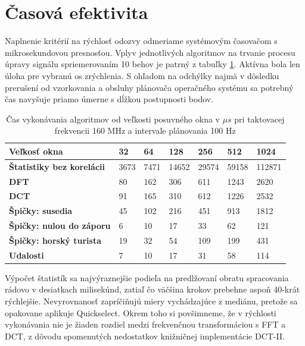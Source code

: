 \section{Časová efektivita}
Naplnenie kritérií na rýchlosť odozvy odmeriame systémovým časovačom s mikrosekundovou presnosťou.
Vplyv jednotlivých algoritmov na trvanie procesu úpravy signálu spriemerovaním 10 behov
je patrný z tabuľky \ref{tab:algorithm-execution}. Aktívna bola len úloha pre vybranú os zrýchlenia. S ohľadom na odchýlky
najmä v dôsledku prerušení od vzorkovania a obsluhy plánovača operačného systému sa potrebný čas navyšuje priamo úmerne
s dĺžkou postupnosti bodov.
\begin{table}[h]
\def\arraystretch{1.25}
\centering
\begin{tabular}{|l|l|l|l|l|l|l|}
\hline
\textbf{Veľkosť okna}         & \textbf{32} & \textbf{64} & \textbf{128} & \textbf{256} & \textbf{512} & \textbf{1024} \\ \hline
\textbf{Štatistiky bez korelácii}& 3673        & 7471        & 14652        & 29574        & 59158        & 112871        \\ \hline
\textbf{DFT}                     & 80          & 162         & 306          & 611          & 1243         & 2620          \\ \hline
\textbf{DCT}                     & 91          & 165         & 310          & 612          & 1226         & 2532          \\ \hline
\textbf{Špičky: susedia}         & 45          & 102         & 216          & 451          & 913          & 1812          \\ \hline
\textbf{Špičky: nulou do záporu} & 6           & 10          & 17           & 33           & 62           & 121           \\ \hline
\textbf{Špičky: horský turista}  & 19          & 32          & 54           & 109          & 199          & 431           \\ \hline
\textbf{Udalosti}                & 7           & 10          & 17           & 31           & 58           & 114           \\ \hline
\end{tabular}
\caption{Čas vykonávania algoritmov od veľkosti posuvného okna v $\mu s$ pri taktovacej frekvencii 160 MHz a intervale
plánovania 100 Hz}
\label{tab:algorithm-execution}
\end{table}

Výpočet štatistík sa najvýraznejšie podieľa na predlžovaní obratu spracovania rádovo v desiatkach
milisekúnd, zatiaľ čo väčšina krokov prebehne aspoň 40-krát rýchlejšie. Nevyrovnanosť zapríčiňujú miery vychádzajúce z
mediánu, pretože sa opakovane aplikuje Quickselect. Okrem toho si povšimneme, že v rýchlosti vykonávania nie je
žiaden rozdiel medzi frekvenčnou transformáciou s FFT a DCT, z dôvodu spomenutých nedostatkov knižničnej implementácie DCT-II.

